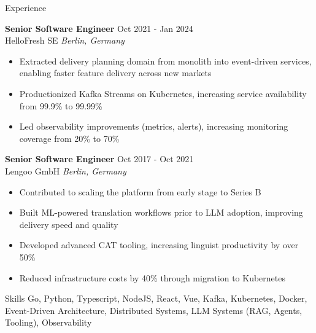 \documentclass{resume}
\begin{document}
\begin{rSection}{Experience}
\vspace{4bp}

\textbf{Senior Software Engineer} \hfill Oct 2021 - Jan 2024\\
HelloFresh SE \hfill \textit{Berlin, Germany}
\begin{itemize}
    \itemsep -3pt {} 
    \item Extracted delivery planning domain from monolith into event-driven services, enabling faster feature delivery across new markets
    \item Productionized Kafka Streams on Kubernetes, increasing service availability from 99.9\% to 99.99\%
    \item Led observability improvements (metrics, alerts), increasing monitoring coverage from 20\% to 70\%
\end{itemize}

\vspace{4bp}

\textbf{Senior Software Engineer} \hfill Oct 2017 - Oct 2021\\
Lengoo GmbH \hfill \textit{Berlin, Germany}
\begin{itemize}
    \itemsep -3pt {} 
    \item Contributed to scaling the platform from early stage to Series B
    \item Built ML-powered translation workflows prior to LLM adoption, improving delivery speed and quality
    \item Developed advanced CAT tooling, increasing linguist productivity by over 50\%
    \item Reduced infrastructure costs by 40\% through migration to Kubernetes
\end{itemize}

\end{rSection}


\begin{rSection}{Skills}
Go, Python, Typescript, NodeJS, React, Vue, Kafka, Kubernetes, Docker, Event-Driven Architecture, Distributed Systems, LLM Systems (RAG, Agents, Tooling), Observability
\end{rSection}

\end{document}
